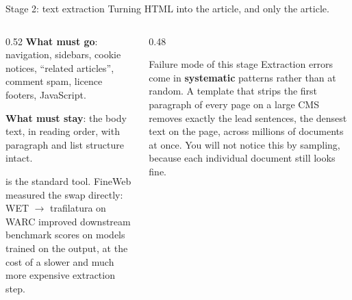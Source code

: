 \documentclass[aspectratio=169,10pt]{beamer}
\begin{document}
\begin{frame}{Stage 2: text extraction}
  Turning HTML into the article, and only the article.
  \vspace{0.6em}
  \begin{columns}[T]
    \begin{column}{0.52\textwidth}
      \textbf{What must go}: navigation, sidebars, cookie notices, ``related
      articles'', comment spam, licence footers, JavaScript.
      \vspace{0.5em}

      \textbf{What must stay}: the body text, in reading order, with paragraph
      and list structure intact.
      \vspace{0.5em}

       is the standard tool. FineWeb measured the swap
      directly: WET $\to$ trafilatura on WARC improved downstream benchmark
      scores on models trained on the output, at the cost of a slower and much
      more expensive extraction step.
    \end{column}
    \begin{column}{0.48\textwidth}
      \begin{block}{Failure mode of this stage}
        \small
        Extraction errors come in \textbf{systematic} patterns rather than at
        random.
        \vspace{0.4em}
        A template that strips the first paragraph of every page on a large CMS
        removes exactly the lead sentences, the densest text on the page,
        across millions of documents at once.
        \vspace{0.4em}
        You will not notice this by sampling, because each individual document
        still looks fine.
      \end{block}
    \end{column}
  \end{columns}
\end{frame}
\end{document}
